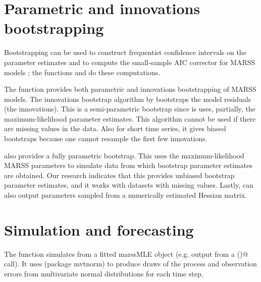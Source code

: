 \section{Parametric and innovations bootstrapping}
Bootstrapping can be used to construct frequentist confidence intervals on the parameter estimates \citep{StofferWall1991} and to compute the small-sample AIC corrector for MARSS models \citep{CavanaughShumway1997}; the functions \verb@MARSSparamCIs@{} and \verb@MARSSaic@{} do these computations. 

The \verb@MARSSboot@{} function provides both parametric and innovations bootstrapping of MARSS models.  
The innovations bootstrap algorithm by \citet{StofferWall1991}  bootstraps the model residuals (the innovations).  This is a semi-parametric bootstrap since is uses, partially, the maximum-likelihood parameter estimates.  This algorithm cannot be used if there are missing values in the data.  Also for short time series, it gives biased bootstraps because one cannot resample the first few innovations.  

\verb@MARSSboot@ also provides a fully parametric bootstrap.  This uses the maximum-likelihood MARSS parameters to simulate data from which bootstrap parameter estimates are obtained.  Our research \citep{HolmesWard2010} indicates that this provides unbiased bootstrap parameter estimates, and it works with datasets with missing values.  Lastly, \verb@MARSSboot@ can also output parameters sampled from a numerically estimated Hessian matrix.  

\section{Simulation and forecasting}
The \verb@MARSSsimulate@{} function simulates from a fitted marssMLE object (e.g. output from a \verb@MARSS()@ call).  It uses \verb@rmvnorm@ (package mvtnorm) to produce draws of the process and observation errors from multivariate normal distributions for each time step.  

